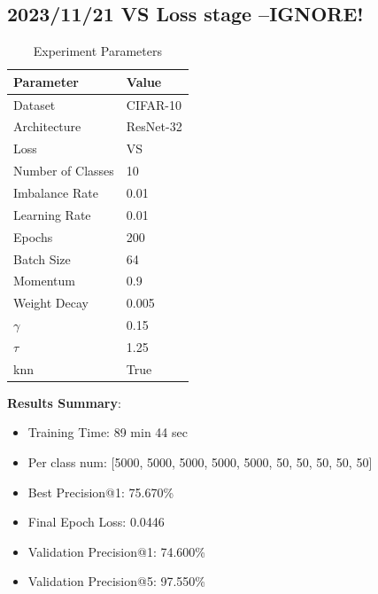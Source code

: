 \documentclass{article}
\begin{document}
\begin{multicols}{2} %
\section{2023/11/21 VS Loss stage --IGNORE!}
\begin{table}[H]
\centering
\caption{Experiment Parameters}
\label{tab:parameters}
\begin{tabular}{ll}
\toprule
Parameter & Value \\
\midrule
Dataset & CIFAR-10 \\
Architecture & ResNet-32 \\
Loss & VS \\
Number of Classes & 10 \\
Imbalance Rate & 0.01 \\
Learning Rate & 0.01 \\
Epochs & 200 \\
Batch Size & 64 \\
Momentum & 0.9 \\
Weight Decay & 0.005 \\
\(\gamma\) & 0.15 \\
\(\tau\) & 1.25 \\
knn & True \\
\bottomrule
\end{tabular}
\end{table}

\textbf{Results Summary}:
\begin{itemize}
    \item Training Time: 89 min 44 sec
    \item Per class num: [5000, 5000, 5000, 5000, 5000, 50, 50, 50, 50, 50]
    \item Best Precision@1: 75.670\%  
    \item Final Epoch Loss: 0.0446
    \item Validation Precision@1: 74.600\%
    \item Validation Precision@5: 97.550\%
\end{itemize}


\end{multicols}
\end{document}
